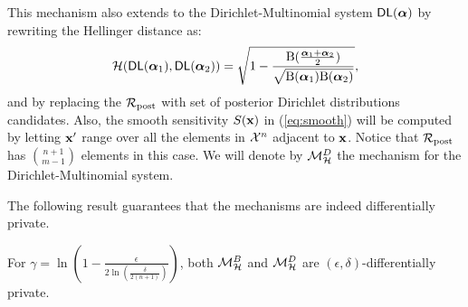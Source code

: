 \documentclass[sigconf]{acmart}
\begin{document}
This mechanism also extends to the Dirichlet-Multinomial system $\mathsf{DL}(\boldsymbol{\alpha})$ by rewriting the Hellinger distance as:
\[
  \mathcal{H}(\mathsf{DL}(\boldsymbol{\alpha}_1), \mathsf{DL}(\boldsymbol{\alpha}_2)) = \sqrt{1 - \frac{\textup{B}(\frac{\boldsymbol{\alpha}_1 + \boldsymbol{\alpha}_2}{2})}{\sqrt{\textup{B}(\boldsymbol{\alpha}_1) \textup{B}(\boldsymbol{\alpha}_2)}}},
\]
and by replacing the $\mathcal{R}_{\textup{post}}$ with set of posterior Dirichlet
distributions candidates. Also, the smooth sensitivity $S(\textbf{x})$
in (\ref{eq:smooth}) will be computed by letting $\textbf{x}'$ range
over all the elements in $\mathcal{X}^{n}$ adjacent to $\textbf{x}$. Notice
that $\mathcal{R}_{\textup{post}}$ has $\binom{n + 1}{m - 1}$ elements in this case. We
will denote by $\mathcal{M}^{D}_{\mathcal{H}}$ the mechanism for the
Dirichlet-Multinomial system.

The following result guarantees that the mechanisms are indeed differentially private.

\begin{theorem}[Privacy] 
\label{thm:privacy}
  For  $\gamma=\ln(1 - \frac{\epsilon}{2 \ln (\frac{\delta}{2 (n + 1)})})$, both
  $\mathcal{M}^{B}_{\mathcal{H}}$ and $\mathcal{M}^{D}_{\mathcal{H}}$ are $(\epsilon,\delta)$-differentially private.
\end{theorem}
\end{document}
